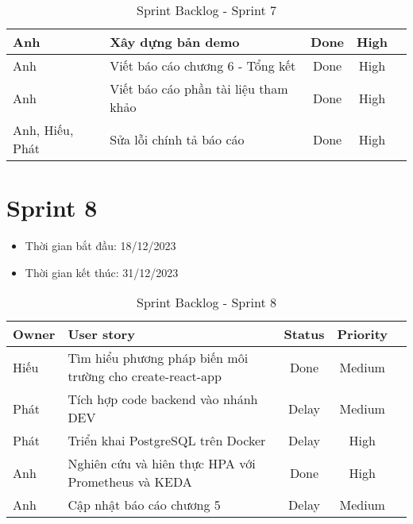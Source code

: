 \begin{table}[H]
\begin{tabular}{|m{2.5cm}|m{9cm}|c|c|c|}
    Anh                & Xây dựng bản demo                     & Done                              & High         \\ \hline
    Anh               & Viết báo cáo chương 6 - Tổng kết                     & Done                              & High         \\ \hline
    Anh               & Viết báo cáo phần tài liệu tham khảo                    & Done                              & High         \\ \hline
    Anh, Hiếu, Phát                & Sửa lỗi chính tả báo cáo                     & Done                              & High         \\ \hline
    \end{tabular}
    \caption{Sprint Backlog - Sprint 7}
    \label{tab:sprint-7}
\end{table}
\section{Sprint 8}
\begin{itemize}
    \item Thời gian bắt đầu: 18/12/2023
    \item Thời gian kết thúc: 31/12/2023
\end{itemize}
\begin{table}[H]
    \begin{tabular}{|m{2.5cm}|m{9cm}|c|c|c|}
    \hline
    \textbf{Owner}  & \textbf{User story}                                & \textbf{Status}  & \textbf{Priority} \\ \hline
    Hiếu               & Tìm hiểu phương pháp biến môi trường cho create-react-app                     & Done                              & Medium         \\ \hline
    Phát              & Tích hợp code backend vào nhánh DEV                     & Delay                              & Medium         \\ \hline
    Phát                & Triển khai PostgreSQL trên Docker                   & Delay                              & High         \\ \hline
    Anh               & Nghiên cứu và hiên thực HPA với Prometheus và KEDA                    & Done                              & High         \\ \hline
    Anh                & Cập nhật báo cáo chương 5                    & Delay                              & Medium         \\ \hline
    \end{tabular}
    \caption{Sprint Backlog - Sprint 8}
    \label{tab:sprint-8}
\end{table}

